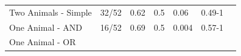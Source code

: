 \documentclass[oneside]{report}
\theoremstyle{definition}
\theoremstyle{definition}
\theoremstyle{definition}
\theoremstyle{remark}
\begin{document}
\begin{longtable}[]{@{}lllllll@{}}
\midrule
\endhead
\begin{minipage}[t]{0.23\columnwidth}\raggedright\strut
Two Animals - Simple\strut
\end{minipage} & \begin{minipage}[t]{0.19\columnwidth}\raggedright\strut
32/52\strut
\end{minipage} & \begin{minipage}[t]{0.08\columnwidth}\raggedright\strut
0.62\strut
\end{minipage} & \begin{minipage}[t]{0.08\columnwidth}\raggedright\strut
0.5\strut
\end{minipage} & \begin{minipage}[t]{0.08\columnwidth}\raggedright\strut
0.06\strut
\end{minipage} & \begin{minipage}[t]{0.08\columnwidth}\raggedright\strut
0.49-1\strut
\end{minipage} & \begin{minipage}[t]{0.08\columnwidth}\raggedright\strut
\strut
\end{minipage}\tabularnewline
\begin{minipage}[t]{0.23\columnwidth}\raggedright\strut
One Animal - AND\strut
\end{minipage} & \begin{minipage}[t]{0.19\columnwidth}\raggedright\strut
16/52\strut
\end{minipage} & \begin{minipage}[t]{0.08\columnwidth}\raggedright\strut
0.69\strut
\end{minipage} & \begin{minipage}[t]{0.08\columnwidth}\raggedright\strut
0.5\strut
\end{minipage} & \begin{minipage}[t]{0.08\columnwidth}\raggedright\strut
0.004\strut
\end{minipage} & \begin{minipage}[t]{0.08\columnwidth}\raggedright\strut
0.57-1\strut
\end{minipage} & \begin{minipage}[t]{0.08\columnwidth}\raggedright\strut
\strut
\end{minipage}\tabularnewline
\begin{minipage}[t]{0.23\columnwidth}\raggedright\strut
One Animal - OR\strut
\end{minipage} & \begin{minipage}[t]{0.19\columnwidth}\raggedright\strut

\end{minipage}
\end{longtable}
\end{document}

